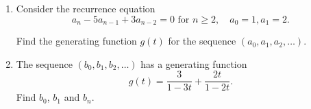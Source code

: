 \documentclass[12pt]{article}
\begin{document}
\begin{enumerate}
Let $e_n$ be your total expected payoff if there are $n$ dollars in the hat now. 

Find the recurrence equation for $e_n$. You don't need to solve it. 

    \item Consider the recurrence equation 
    \[
    a_n - 5 a_{n-1} + 3a_{n-2} = 0 \text{ for } n\geq 2, \quad a_0 = 1, a_1 = 2.
    \]

    Find the generating function $g(t)$ for the sequence $(a_0, a_1, a_2, \dots)$. 

    \item The sequence $(b_0, b_1, b_2, \dots)$ has a generating function 
    \[
    g(t) = \frac{3}{1-3t} + \frac{2t}{1-2t}.
    \]
    Find $b_0$, $b_1$ and $b_n$.

\end{enumerate}
\end{document}
